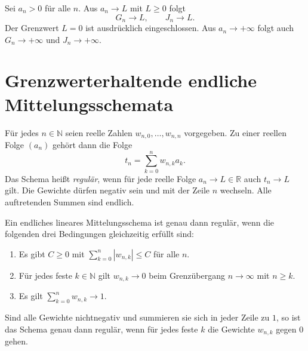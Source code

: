 \begin{theorem}
\label{b21guide:thm:geometric-harmonic}
Sei $a_n>0$ für alle $n$.
Aus $a_n\to L$ mit $L\geq0$ folgt
\[
 G_n\to L,\qquad J_n\to L.
\]
Der Grenzwert $L=0$ ist ausdrücklich eingeschlossen.
Aus $a_n\to+\infty$ folgt auch $G_n\to+\infty$ und $J_n\to+\infty$.
\end{theorem}

\section{Grenzwerterhaltende endliche Mittelungsschemata}

\begin{definition}
\label{b21guide:def:regular-scheme}
Für jedes $n\in\mathbb N$ seien reelle Zahlen
$w_{n,0},\ldots,w_{n,n}$ vorgegeben.
Zu einer reellen Folge $(a_n)$ gehört dann die Folge
\[
 t_n=\sum_{k=0}^{n}w_{n,k}a_k.
\]
Das Schema heißt \emph{regulär}, wenn für jede reelle Folge
$a_n\to L\in\mathbb R$ auch $t_n\to L$ gilt.
Die Gewichte dürfen negativ sein und mit der Zeile $n$ wechseln.
Alle auftretenden Summen sind endlich.
\end{definition}

\begin{theorem}
\label{b21guide:thm:toeplitz}
Ein endliches lineares Mittelungsschema ist genau dann regulär,
wenn die folgenden drei Bedingungen gleichzeitig erfüllt sind:
\begin{enumerate}
 \item Es gibt $C\geq0$ mit
 $\sum_{k=0}^{n}|w_{n,k}|\leq C$ für alle $n$.
 \item Für jedes feste $k\in\mathbb N$ gilt $w_{n,k}\to0$
 beim Grenzübergang $n\to\infty$ mit $n\geq k$.
 \item Es gilt $\sum_{k=0}^{n}w_{n,k}\to1$.
\end{enumerate}
Sind alle Gewichte nichtnegativ und summieren sie sich in
jeder Zeile zu $1$, so ist das Schema genau dann regulär,
wenn für jedes feste $k$ die Gewichte $w_{n,k}$ gegen $0$ gehen.
\end{theorem}


